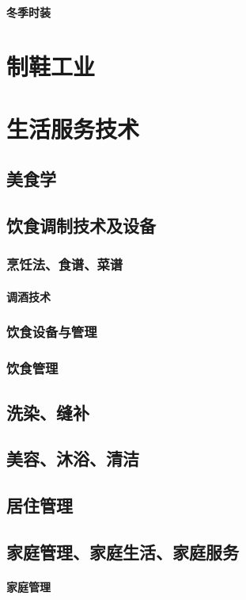 \documentclass[UTF8]{../../ApplicationUniverse}
\begin{document}
    \subsubsection{冬季时装}

\chapter{制鞋工业}


\chapter{生活服务技术}
\section{美食学}
\section{饮食调制技术及设备}
    \subsection{烹饪法、食谱、菜谱}
        \subsubsection{调酒技术}
    \subsection{饮食设备与管理}
    \subsection{饮食管理}
\section{洗染、缝补}
\section{美容、沐浴、清洁}
\section{居住管理}
\section{家庭管理、家庭生活、家庭服务}
    \subsubsection{家庭管理}
\end{document}
